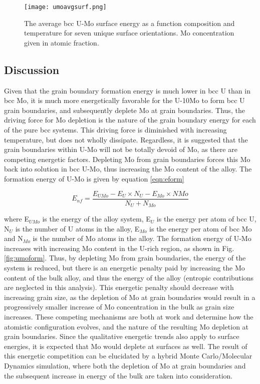 \documentclass[review]{elsarticle}
\begin{document}
\begin{figure}[h]
 \centering
 \texttt{[image: umoavgsurf.png]} 
 \caption{The average bcc U-Mo surface energy as a function composition and temperature for seven unique surface orientations. Mo concentration given in atomic fraction.}
 \label{fig:avgvsmoS}
\end{figure}

\FloatBarrier

\subsection{Discussion}

Given that the grain boundary formation energy is much lower in bcc U than in bcc Mo, it is much more energetically favorable for the U-10Mo to form bcc U grain boundaries, and subsequently deplete Mo at grain boundaries. Thus, the driving force for Mo depletion is the nature of the grain boundary energy for each of the pure bcc systems. This driving force is diminished with increasing temperature, but does not wholly dissipate. Regardless, it is suggested that the grain boundaries within U-Mo will not be totally devoid of Mo, as there are competing energetic factors. Depleting Mo from grain boundaries forces this Mo back into solution in bcc U-Mo, thus increasing the Mo content of the alloy. The formation energy of U-Mo is given by equation \ref{eqn:eform}

\begin{equation}
\label{eqn:eform}
E_{nf}= \frac{ E_{UMo} - E_{U} \times N_{U} - E_{Mo} \times N{Mo} }{ N_{U} + N_{Mo} }
\end{equation}

where E$_{UMo}$ is the energy of the alloy system, E$_{U}$ is the energy per atom of bcc U, N$_{U}$ is the number of U atoms in the alloy, E$_{Mo}$ is the energy per atom of bcc Mo and N$_{Mo}$ is the number of Mo atoms in the alloy. The formation energy of U-Mo increases with increasing Mo content in the U-rich region, as shown in Fig. \ref{fig:umoform}. Thus, by depleting Mo from grain boundaries, the energy of the system is reduced, but there is an energetic penalty paid by increasing the Mo content of the bulk alloy, and thus the energy of the alloy (entropic contributions are neglected in this analysis). This energetic penalty should decrease with increasing grain size, as the depletion of Mo at grain boundaries would result in a progressively smaller increase of Mo concentration in the bulk as grain size increases. These competing mechanisms are both at work and determine how the atomistic configuration evolves, and the nature of the resulting Mo depletion at grain boundaries. Since the qualitative energetic trends also apply to surface energies, it is expected that Mo would deplete at surfaces as well. The result of this energetic competition can be elucidated by a hybrid Monte Carlo/Molecular Dynamics simulation, where both the depletion of Mo at grain boundaries and the subsequent increase in energy of the bulk are taken into consideration.
\end{document}
